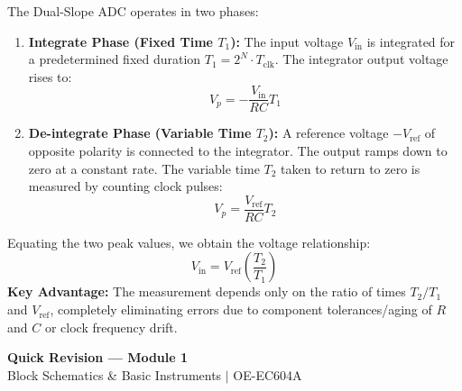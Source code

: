 \documentclass[12pt,a4paper]{article}
\begin{document}
\begin{tcolorbox}[formulabox, title={\textbf{Dual-Slope ADC Integration Principle}}]
The Dual-Slope ADC operates in two phases:
\begin{enumerate}[leftmargin=*, itemsep=2.5pt]
  \item \textbf{Integrate Phase (Fixed Time $T_1$):} The input voltage $V_{\text{in}}$ is integrated for a predetermined fixed duration $T_1 = 2^N \cdot T_{\text{clk}}$. The integrator output voltage rises to:
    \begin{equation}
      V_p = -\frac{V_{\text{in}}}{RC} T_1
    \end{equation}
  \item \textbf{De-integrate Phase (Variable Time $T_2$):} A reference voltage $-V_{\text{ref}}$ of opposite polarity is connected to the integrator. The output ramps down to zero at a constant rate. The variable time $T_2$ taken to return to zero is measured by counting clock pulses:
    \begin{equation}
      V_p = \frac{V_{\text{ref}}}{RC} T_2
    \end{equation}
\end{enumerate}
Equating the two peak values, we obtain the voltage relationship:
\begin{equation}
  V_{\text{in}} = V_{\text{ref}} \left( \frac{T_2}{T_1} \right)
\end{equation}
\textbf{Key Advantage:} The measurement depends only on the ratio of times $T_2/T_1$ and $V_{\text{ref}}$, completely eliminating errors due to component tolerances/aging of $R$ and $C$ or clock frequency drift.
\end{tcolorbox}

\newpage
\begin{center}
  {\large\bfseries\color{myred} Quick Revision --- Module 1}\\[3pt]
  {\small\color{mydark} Block Schematics \& Basic Instruments $|$ OE-EC604A}
\end{center}
\noindent{\color{myred}\rule{\linewidth}{1.2pt}}
\vspace{4pt}
\end{document}
